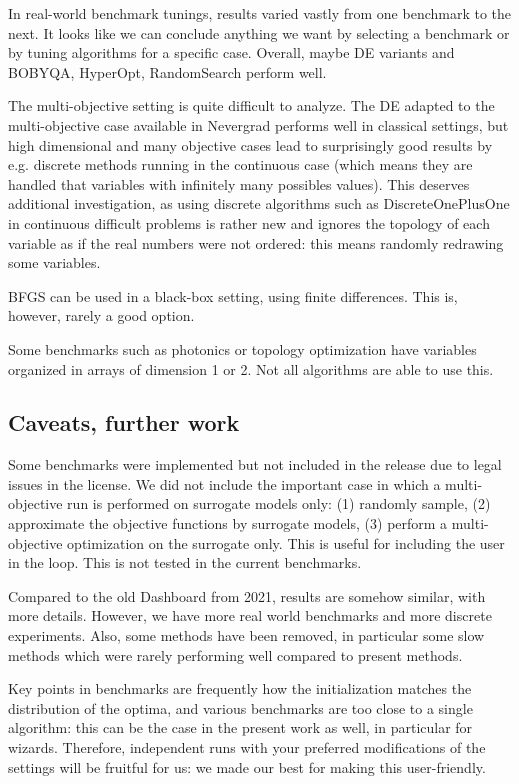 In real-world benchmark tunings, results varied vastly from one benchmark to the next.  It looks like we can conclude 
anything we want by selecting a benchmark or by tuning algorithms for a specific case. Overall, maybe DE variants and
BOBYQA, HyperOpt, RandomSearch perform well.

The multi-objective setting is quite difficult to analyze. The DE adapted to the multi-objective case available in
Nevergrad\cite{pde,mode} performs well in classical settings, but high dimensional and many objective cases lead to surprisingly good
results  by e.g. discrete methods running in the continuous case (which means they are handled that variables with
infinitely many possibles values). This deserves additional investigation, as using discrete algorithms such as
DiscreteOnePlusOne in continuous difficult problems is rather new and ignores the topology of each variable as if the
real numbers were not ordered: this means randomly redrawing some variables.

BFGS can be used in a black-box setting, using finite differences. This is, however, rarely a good option.

Some benchmarks such as photonics or topology optimization have variables organized in arrays of dimension 1 or 2. Not
all algorithms are able to use this.

\subsection{Caveats, further work}
Some benchmarks were implemented but not included in the release due to legal issues in the license. 
We did not include the important case in which a multi-objective run is performed on surrogate models only: (1) randomly sample, (2) approximate the objective functions by surrogate models, (3) perform a multi-objective optimization on the surrogate only. This is useful for including the user in the loop. This is not tested in the current benchmarks.

Compared to the old Dashboard from 2021, results are somehow similar, with more details. However, we have more real world benchmarks and more discrete experiments. Also,
some methods have been removed, in particular some slow methods which were rarely performing well compared to present methods.

Key points in benchmarks are frequently how the initialization matches the distribution of the optima, and various
benchmarks are too close to a single algorithm: this can be the case in the present work as well, in particular for
wizards. Therefore, independent runs with your preferred modifications of the settings will be fruitful for us: we made our best
for making this user-friendly.
